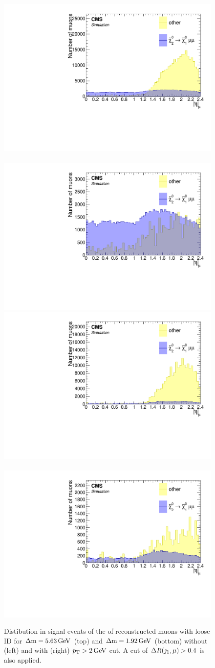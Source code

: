 \begin{figure}[!htb]
\centering
\includegraphics[width=0.48\linewidth]{plots/lepton_selection/lepton_selection_dm5p63/none_Muons_Eta.pdf} \,
\includegraphics[width=0.48\linewidth]{plots/lepton_selection/lepton_selection_dm5p63/none_Muons_Eta_after_pt.pdf} \\
\includegraphics[width=0.48\linewidth]{plots/lepton_selection/lepton_selection_dm1p92/none_Muons_Eta.pdf}  \,
\includegraphics[width=0.48\linewidth]{plots/lepton_selection/lepton_selection_dm1p92/none_Muons_Eta_after_pt.pdf} \\
\caption[Distibution in signal events of the \abs{\eta} of reconstructed muons with loose ID before and after $\pt>2\GeV$ cut]{Distibution in signal events of the \abs{\eta} of reconstructed muons with loose ID for $\Delta\mathrm{m}=5.63\,\text{Ge\hspace{-.08em}V}$ (top) and $\Delta\mathrm{m}=1.92\,\text{Ge\hspace{-.08em}V}$ (bottom) without (left) and with (right) $\pt>2\GeV$ cut. A cut of $\Delta R(\jmath_1,\mu)>0.4$ is also applied.}
\label{fig:muons-selection-eta}
\end{figure}

